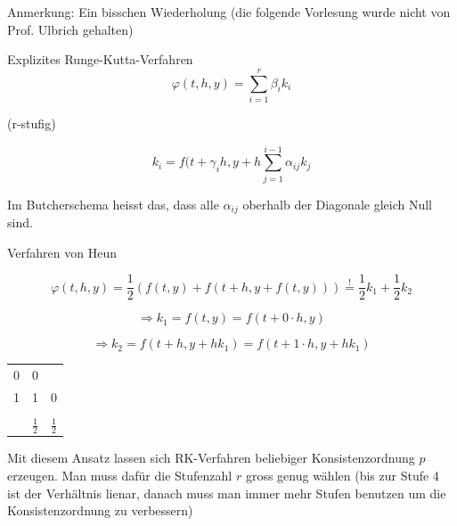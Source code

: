 \documentclass[10pt,a4paper]{article}
\begin{document}

Anmerkung: Ein bisschen Wiederholung (die folgende Vorlesung wurde nicht von Prof. Ulbrich gehalten)

Explizites Runge-Kutta-Verfahren
$$\varphi(t,h,y) = \sum^{r}_{i=1} \beta_i k_i$$

(r-stufig)

$$k_i = f(t+\gamma_i h, y + h \sum^{i-1}_{j=1} \alpha_{ij}k_j$$

Im Butcherschema heisst das, dass alle $\alpha_{ij}$ oberhalb der Diagonale gleich Null sind.

\begin{bsp}

Verfahren von Heun

$$\varphi(t,h,y) = \frac{1}{2}(f(t,y)+f(t+h,y+f(t,y))) \stackrel{!}{=} \frac{1}{2}k_1 + \frac{1}{2}k_2$$

$$\Rightarrow k_1 = f(t,y) = f(t + 0 \cdot h,y)$$

$$\Rightarrow k_2 = f(t+h,y+hk_1)=f(t+1 \cdot h,y+hk_1)$$

\begin{table}[H]
\centering
\begin{tabular}{c| c c}
0 & 0 &\\
1 & 1 & 0 \\
\hline \\
 & $\frac{1}{2}$& $\frac{1}{2}$
\end{tabular}
\end{table}


\end{bsp}


Mit diesem Ansatz lassen sich RK-Verfahren beliebiger Konsistenzordnung $p$ erzeugen. Man muss dafür die Stufenzahl $r$ gross genug wählen (bis zur Stufe 4 ist der Verhältnis lienar, danach muss man immer mehr Stufen benutzen um die Konsistenzordnung zu verbessern)
\end{document}
